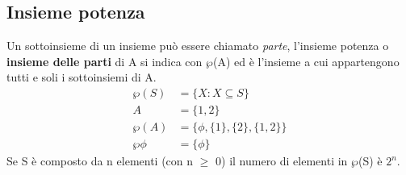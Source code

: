 \subsection{Insieme potenza}
Un sottoinsieme di un insieme può essere chiamato \textit{parte}, l'insieme potenza
o \textbf{insieme delle parti} di A si indica con $\wp$(A) ed è l'insieme a cui appartengono tutti e soli i sottoinsiemi di A. \\
\begin{align*}
    \wp(S) &= \{X : X \subseteq S\} \\
    A &= \{1, 2\} \\
    \wp(A) &= \{\phi, \{1\}, \{2\}, \{1, 2\}\} \\
    \wp\phi &= \{\phi\}
\end{align*}
Se S è composto da n elementi (con n $\geq$ 0) il numero di elementi in $\wp$(S) è $2^n$.